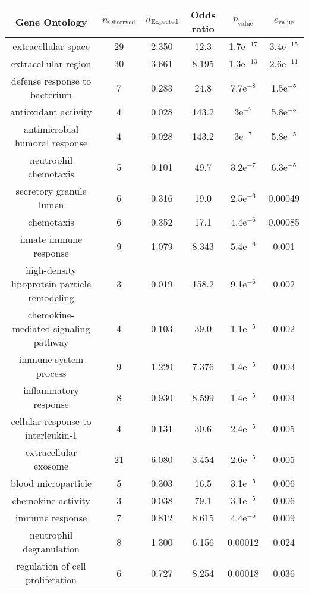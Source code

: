 \documentclass[USLetter,5pt]{article}
\begin{document}
\begin{table}[ht]
\centering
\begin{adjustbox}{width = 1\textwidth}
\small\begin{tabular}{|c|c|c|c|c|c|}
\hline
Gene Ontology & $n_{\mathrm{Observed}}$ & $n_{\mathrm{Expected}}$ & Odds ratio & $p_{\mathrm{value}}$ & $e_{\mathrm{value}}$\\
\hline
extracellular space & 29 &  2.350 &   12.3 & 1.7e$^{-17}$ & 3.4e$^{-15}$\\
extracellular region & 30 &  3.661 &  8.195 & 1.3e$^{-13}$ & 2.6e$^{-11}$\\
defense response to bacterium & 7 &  0.283 &   24.8 & 7.7e$^{-8}$ & 1.5e$^{-5}$\\
antioxidant activity & 4 &  0.028 &  143.2 &   3e$^{-7}$ & 5.8e$^{-5}$\\
antimicrobial humoral response & 4 &  0.028 &  143.2 &   3e$^{-7}$ & 5.8e$^{-5}$\\
neutrophil chemotaxis & 5 &  0.101 &   49.7 & 3.2e$^{-7}$ & 6.3e$^{-5}$\\
secretory granule lumen & 6 &  0.316 &   19.0 & 2.5e$^{-6}$ & 0.00049\\
chemotaxis & 6 &  0.352 &   17.1 & 4.4e$^{-6}$ & 0.00085\\
innate immune response & 9 &  1.079 &  8.343 & 5.4e$^{-6}$ &  0.001\\
high-density lipoprotein particle remodeling & 3 &  0.019 &  158.2 & 9.1e$^{-6}$ &  0.002\\
chemokine-mediated signaling pathway & 4 &  0.103 &   39.0 & 1.1e$^{-5}$ &  0.002\\
immune system process & 9 &  1.220 &  7.376 & 1.4e$^{-5}$ &  0.003\\
inflammatory response & 8 &  0.930 &  8.599 & 1.4e$^{-5}$ &  0.003\\
cellular response to interleukin-1 & 4 &  0.131 &   30.6 & 2.4e$^{-5}$ &  0.005\\
extracellular exosome & 21 &  6.080 &  3.454 & 2.6e$^{-5}$ &  0.005\\
blood microparticle & 5 &  0.303 &   16.5 & 3.1e$^{-5}$ &  0.006\\
chemokine activity & 3 &  0.038 &   79.1 & 3.1e$^{-5}$ &  0.006\\
immune response & 7 &  0.812 &  8.615 & 4.4e$^{-5}$ &  0.009\\
neutrophil degranulation & 8 &  1.300 &  6.156 & 0.00012 &  0.024\\
regulation of cell proliferation & 6 &  0.727 &  8.254 & 0.00018 &  0.036\\

\end{tabular}
\end{adjustbox}
\end{table}
\end{document}

